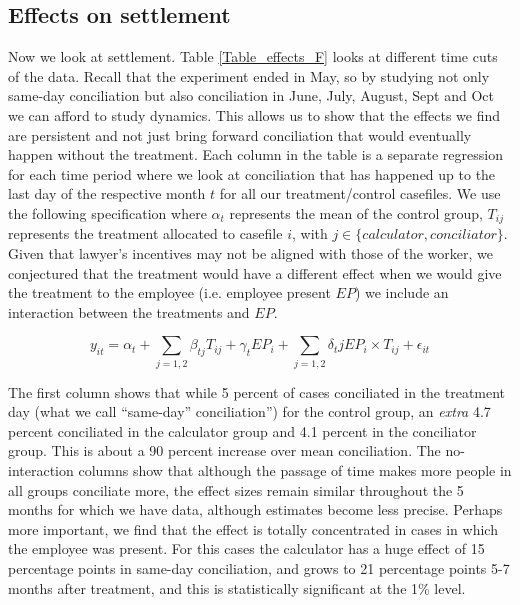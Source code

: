\documentclass[11pt]{article}
\begin{document}
\subsection{Effects on settlement}

Now we look at settlement. Table \ref{Table_effects_F} looks at different time cuts of the data. Recall that the experiment ended in May, so by studying  not only same-day conciliation but also conciliation in June, July, August, Sept and Oct we can afford to study dynamics. This allows us to show that the effects we find are persistent and not just bring forward conciliation that would eventually happen without the treatment. Each column in the table is a separate regression for each time period where we look at conciliation that has happened up to the last day of the respective month $t$ for all our treatment/control casefiles. We use the following specification where $\alpha_t$ represents the mean of the control group, $T_{ij}$ represents the treatment allocated to casefile $i$, with $j \in \{calculator, conciliator\}$. Given that lawyer's incentives may not be aligned with those of the worker, we conjectured that the treatment would have a different effect when we would give the treatment to the employee (i.e. employee present $EP$) we include an interaction between the treatments and $EP$. 

\begin{equation} \label{reg_spec}
y_{it} = \alpha_t + \sum_{j = 1,2}\beta_{tj} T_{ij} + \gamma_t EP_i + \sum_{j = 1,2}\delta_tj EP_i \times T_{ij} +\epsilon_{it}
\end{equation}


The first column shows that while 5 percent of cases conciliated in the treatment day (what we call ``same-day'' conciliation'') for the control group, an \textit{extra} 4.7 percent conciliated in the calculator group and 4.1 percent in the conciliator group. This is about a 90 percent increase over mean conciliation. The no-interaction columns show that although the passage of time makes more people in all groups conciliate more, the effect sizes remain similar throughout the 5 months for which we have data, although estimates become less precise. Perhaps more important, we find that the effect is totally concentrated in cases in which the employee was present. For this cases the calculator has a huge effect of 15 percentage points in same-day conciliation, and grows to 21 percentage points 5-7 months after treatment, and this is statistically significant at the 1\% level. 
\end{document}
